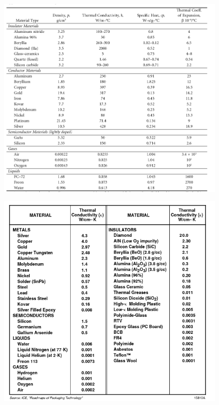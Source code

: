\documentclass[final]{cubedoc}
\begin{document}
\begin{figure}[h!]
    \centering
    \includegraphics[width=\linewidth]{docs/table_properties_blackwell_handbook.png}
    \caption{\cite[p.408]{blackwell2017electronic}}
    \label{fig:springer_properties}
\end{figure}

\begin{figure}[h!]
    \centering
    \includegraphics[width=\linewidth]{docs/table_properties_smith.png}
    \caption{\cite[6-14]{chip}}
    \label{fig:intel_conduct}
\end{figure}
\end{document}
